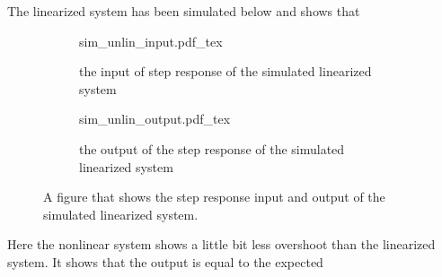 \documentclass[12pt]{article}
\begin{document}
The linearized system has been simulated below and shows that

\begin{figure}[H]
\centering
\begin{subfigure}{0.5\textwidth}
  \def\svgwidth{\textwidth}
  {sim_unlin_input.pdf_tex}
  \label{}
  \centering
  \caption{the input of step response of the simulated linearized system} \label{my_input_step_li}
\end{subfigure}%
\begin{subfigure}{0.5\textwidth}
  \centering
  \def\svgwidth{\textwidth}
  {sim_unlin_output.pdf_tex}
  \caption{the output of the step response of the simulated linearized system} \label{my_output_step_li}
\end{subfigure}
\caption{A figure that shows the step response input and output of the simulated linearized system.}
\label{fig:step_li}
\end{figure}

Here the nonlinear system shows a little bit less overshoot than the linearized system. It shows that the output is equal to the expected


\begin{figure}

\end{figure}
\end{document}
